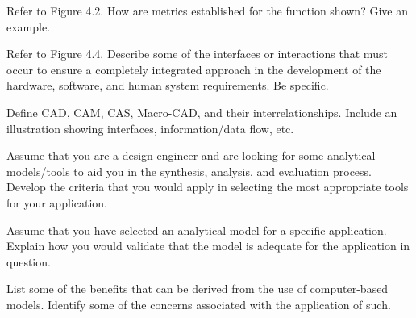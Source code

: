 \begin{exercises}
    \begin{exercise}
    \label{sea-04-13}
        Refer to Figure 4.2. How are metrics established for the function shown? Give an example.
    \end{exercise}
    \begin{solution}
    \end{solution}
    
    \begin{exercise}
    \label{sea-04-14}
        Refer to Figure 4.4. Describe some of the interfaces or interactions that must occur to ensure a completely integrated approach in the development of the hardware, software, and human system requirements. Be specific.
    \end{exercise}
    \begin{solution}
    \end{solution}
    
    \begin{exercise}
    \label{sea-04-15}
        Define CAD, CAM, CAS, Macro-CAD, and their interrelationships. Include an illustration showing interfaces, information/data flow, etc.
    \end{exercise}
    \begin{solution}
    \end{solution}
    
    \begin{exercise}
    \label{sea-04-16}
        Assume that you are a design engineer and are looking for some analytical models/tools to aid you in the synthesis, analysis, and evaluation process. Develop the criteria that you would apply in selecting the most appropriate tools for your application.
    \end{exercise}
    \begin{solution}
    \end{solution}
    
    \begin{exercise}
    \label{sea-04-17}
        Assume that you have selected an analytical model for a specific application. Explain how you would validate that the model is adequate for the application in question.
    \end{exercise}
    \begin{solution}
    \end{solution}
    
    \begin{exercise}
    \label{sea-04-19}
        List some of the benefits that can be derived from the use of computer-based models. Identify some of the concerns associated with the application of such.
    \end{exercise}
    \begin{solution}
    \end{solution}
    

\end{exercises}
